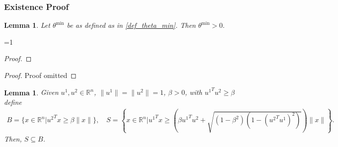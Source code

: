 \documentclass{article}
\newenvironment{comment}
  {\par\medskip
   \color{red}%
   \begin{framed}
   \textbf{Comment: }\ignorespaces}
 {\end{framed}
  \medskip}
\newtheorem{lemma}[theorem]{Lemma}
\theoremstyle{case}
\newcommand{\rn}{{\mathbb R^{n}}}
\def\includeproofs{1}
\begin{document}
\subsubsection{Existence Proof}

\begin{lemma}
Let $\theta^{\text{min}}$ be as defined as in \cref{def_theta_min}.
Then $\theta^{\text{min}} > 0.$
\end{lemma}

\ifnum\includeproofs=1
\begin{proof}


\end{proof}
\else
\begin{proof}
Proof omitted
\end{proof}
\fi




\begin{lemma}
\label{cone_subset_cone}
Given $u^1, u^2 \in \rn$, $\|u^1\| = \|u^2\|= 1$, $\beta >0$, with ${u^1}^Tu^2 \ge \beta$ define
\begin{align*}
B = \{x\in\rn | {u^2}^Tx \ge \beta\|x\|\}, \quad
S = \left\{x\in\rn \bigg| {u^1}^Tx \ge \left(\beta {u^1}^Tu^2 + \sqrt{(1 - \beta^2)\left(1 - ({u^2}^Tu^1)^2\right)}\right)\|x\| \right\}. 
\end{align*}
Then, $S \subseteq B$.
\end{lemma}
\end{document}
